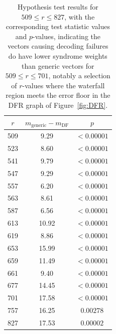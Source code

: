 \begin{table}[ht]
\centering
\begin{tabular}{c|c|c}
$r$   & $m_{\text{generic}} - m_{\text{DF}}$ & $p$                \\
\hline
509 & 9.29                          & $< 0.00001$ \\
523 & 8.60                          & $< 0.00001$ \\
541 & 9.79                          & $< 0.00001$ \\
547 & 9.29                          & $< 0.00001$ \\
557 & 6.20                          & $< 0.00001$ \\
563 & 8.61                          & $< 0.00001$ \\
587 & 6.56                          & $< 0.00001$ \\
613 & 10.92                         & $< 0.00001$ \\
619 & 8.86                          & $< 0.00001$ \\
653 & 15.99                          & $< 0.00001$ \\
659 & 11.49                          & $< 0.00001$ \\
661 & 9.40                          & $< 0.00001$ \\
677 & 14.45                          & $< 0.00001$ \\
701 & 17.58                          & $< 0.00001$ \\
757 & 16.25                          & $ 0.00278$ \\
827 & 17.53                          & $ 0.00002$ \\

\end{tabular}
\caption{Hypothesis test results for $509 \leq r \leq 827$, with the corresponding test statistic values and $p$-values, indicating the vectors causing decoding failures do have lower syndrome weights than generic vectors for $509 \leq r \leq 701$, notably a selection of $r$-values where the waterfall region meets the error floor in the DFR graph of Figure~\ref{fig:DFR}.}\label{table:hyp_test_ts_and_ps}
\end{table}




